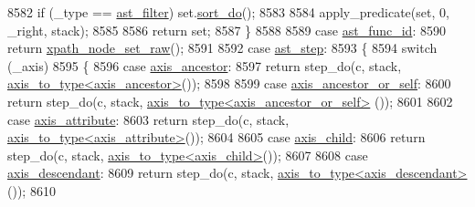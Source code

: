 \begin{DoxyCode}
8582                 \textcolor{keywordflow}{if} (\_type == \hyperlink{pugixml_8cpp_a11258a240266b84b6b0526930e5d330da0c9430d6adbe88945efa5a1cb100d843}{ast\_filter}) set.\hyperlink{classxpath__node__set__raw_a5e46ee306afc24ea83f6c1181bba3600}{sort\_do}();
8583 
8584                 apply\_predicate(set, 0, \_right, stack);
8585             
8586                 \textcolor{keywordflow}{return} set;
8587             \}
8588             
8589             \textcolor{keywordflow}{case} \hyperlink{pugixml_8cpp_a11258a240266b84b6b0526930e5d330daf858fa45ee843ccfe4c7d2ae226a5e8c}{ast\_func\_id}:
8590                 \textcolor{keywordflow}{return} \hyperlink{classxpath__node__set__raw}{xpath\_node\_set\_raw}();
8591             
8592             \textcolor{keywordflow}{case} \hyperlink{pugixml_8cpp_a11258a240266b84b6b0526930e5d330daa6229c263d2e6f239a78d56b6f8aaf19}{ast\_step}:
8593             \{
8594                 \textcolor{keywordflow}{switch} (\_axis)
8595                 \{
8596                 \textcolor{keywordflow}{case} \hyperlink{pugixml_8cpp_ae7747145441b0591a5c04f20f6f9189aad6f039a708acaaf1f7404cb061aac86f}{axis\_ancestor}:
8597                     \textcolor{keywordflow}{return} step\_do(c, stack, \hyperlink{structaxis__to__type}{axis\_to\_type<axis\_ancestor>}());
8598                     
8599                 \textcolor{keywordflow}{case} \hyperlink{pugixml_8cpp_ae7747145441b0591a5c04f20f6f9189aa22656c644b010657ddc2635d97e7b4a3}{axis\_ancestor\_or\_self}:
8600                     \textcolor{keywordflow}{return} step\_do(c, stack, \hyperlink{structaxis__to__type}{axis\_to\_type<axis\_ancestor\_or\_self>}
      ());
8601 
8602                 \textcolor{keywordflow}{case} \hyperlink{pugixml_8cpp_ae7747145441b0591a5c04f20f6f9189aa3e7282ac37732c350a6f4890a3ab6401}{axis\_attribute}:
8603                     \textcolor{keywordflow}{return} step\_do(c, stack, \hyperlink{structaxis__to__type}{axis\_to\_type<axis\_attribute>}());
8604 
8605                 \textcolor{keywordflow}{case} \hyperlink{pugixml_8cpp_ae7747145441b0591a5c04f20f6f9189aa6919787a75cb4c83edb15f11fbe98faa}{axis\_child}:
8606                     \textcolor{keywordflow}{return} step\_do(c, stack, \hyperlink{structaxis__to__type}{axis\_to\_type<axis\_child>}());
8607                 
8608                 \textcolor{keywordflow}{case} \hyperlink{pugixml_8cpp_ae7747145441b0591a5c04f20f6f9189aa835de5174f348c3a6b926f3467827ab9}{axis\_descendant}:
8609                     \textcolor{keywordflow}{return} step\_do(c, stack, \hyperlink{structaxis__to__type}{axis\_to\_type<axis\_descendant>}());
8610 

\end{DoxyCode}
